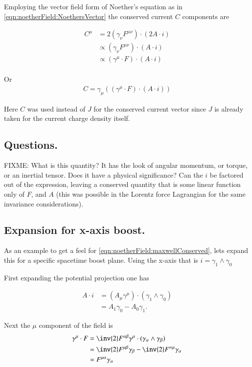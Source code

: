 Employing the vector field form of Noether's equation as in \ref{eqn:noetherField:NoethersVector} the conserved current $C$ components are

\begin{align*}
C^\mu &= 2 (\gamma_\nu F^{\mu\nu}) \cdot (2 A \cdot i) \\
&\propto (\gamma_\nu F^{\mu\nu}) \cdot (A \cdot i) \\
&\propto (\gamma^\mu \cdot F) \cdot (A \cdot i) \\
\end{align*}

Or 
\begin{align}\label{eqn:noetherField:maxwellConserved}
C = \gamma_\mu ((\gamma^\mu \cdot F) \cdot (A \cdot i))
\end{align}

Here $C$ was used instead of $J$ for the conserved current vector since $J$ is already taken for the current charge density itself.

\subsection{Questions. }

FIXME: What is this quantity?  It has the look of
angular momentum, or torque, or an inertial tensor.  Does it have a physical significance?  Can the $i$ be factored out of the expression, leaving a conserved quantity that is some linear function only of $F$, and $A$ (this was possible in the Lorentz force Lagrangian for the same invariance considerations).

\subsection{Expansion for x-axis boost. }

As an example to get a feel for \ref{eqn:noetherField:maxwellConserved}, lets expand
this for a specific spacetime boost plane.  Using the x-axis that is $i=\gamma_1 \wedge \gamma_0$

First expanding the potential projection one has

\begin{align*}
A \cdot i &= (A_\mu \gamma^\mu) \cdot (\gamma_1 \wedge \gamma_0) \\
&= A_1 \gamma_0 - A_0 \gamma_1.
\end{align*}

Next the $\mu$ component of the field is
\begin{align*}
\gamma^\mu \cdot F
&= \inv{2} F^{\alpha\beta} \gamma^\mu \cdot (\gamma_\alpha \wedge \gamma_\beta) \\
&= \inv{2} F^{\mu\beta} \gamma_\beta -\inv{2} F^{\alpha\mu} \gamma_\alpha \\
&= F^{\mu\alpha} \gamma_\alpha \\
\end{align*}

